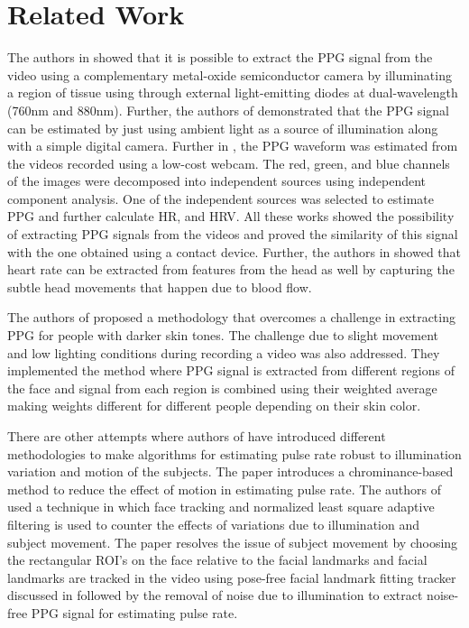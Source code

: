 \section{Related Work}\label{sec:related}
 
The authors in \cite{humphreys2007noncontact} showed that it is possible to extract the PPG signal from the video using a complementary metal-oxide semiconductor camera by illuminating a region of tissue using through external light-emitting diodes at dual-wavelength (760nm and 880nm).  Further, the authors of  \cite{verkruysse2008remote} demonstrated that the PPG signal can be estimated by just using ambient light as a source of illumination along with a simple digital camera.  Further in \cite{poh2011advancements}, the PPG waveform was estimated from the videos recorded using a low-cost webcam. The red, green, and blue channels of the images were decomposed into independent sources using independent component analysis. One of the independent sources was selected to estimate PPG and further calculate HR, and HRV. All these works showed the possibility of extracting PPG signals from the videos and proved the similarity of this signal with the one obtained using a contact device. Further, the authors in \cite{10.1109/CVPR.2013.440} showed that heart rate can be extracted from features from the head as well by capturing the subtle head movements that happen due to blood flow.

%
The authors of \cite{kumar2015distanceppg} proposed a methodology that overcomes a challenge in extracting PPG for people with darker skin tones. The challenge due to slight movement and low lighting conditions during recording a video was also addressed. They implemented the method where PPG signal is extracted from different regions of the face and signal from each region is combined using their weighted average making weights different for different people depending on their skin color. 
%

There are other attempts where authors of \cite{6523142,6909939, 7410772, 7412627} have introduced different methodologies to make algorithms for estimating pulse rate robust to illumination variation and motion of the subjects. The paper \cite{6523142} introduces a chrominance-based method to reduce the effect of motion in estimating pulse rate. The authors of \cite{6909939} used a technique in which face tracking and normalized least square adaptive filtering is used to counter the effects of variations due to illumination and subject movement. 
The paper \cite{7410772} resolves the issue of subject movement by choosing the rectangular ROI's on the face relative to the facial landmarks and facial landmarks are tracked in the video using pose-free facial landmark fitting tracker discussed in \cite{yu2016face} followed by the removal of noise due to illumination to extract noise-free PPG signal for estimating pulse rate. 

